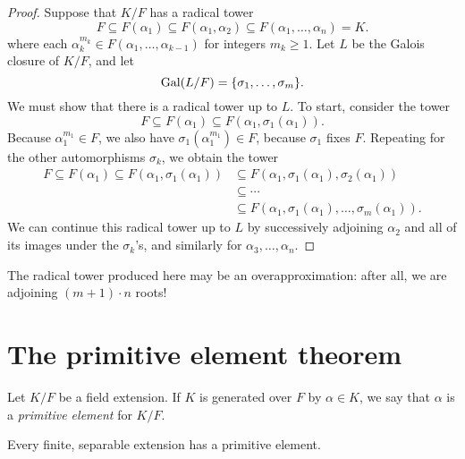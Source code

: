 \begin{proof}
    Suppose that $K/F$ has a radical tower
    \[
        F \subseteq F(\alpha_1) \subseteq F(\alpha_1, \alpha_2) \subseteq F(\alpha_1, \ldots, \alpha_n) = K.
    \]
    where each $\alpha_k^{m_k} \in F(\alpha_1, \ldots, \alpha_{k - 1})$ for integers $m_k \geq 1$. Let $L$ be the Galois closure of $K/F$, and let
    \[
        \operatorname{Gal}(L/F) = \{\sigma_1, \ldots, \sigma_m\}.
    \]
    We must show that there is a radical tower up to $L$. To start, consider the tower
    \[
        F \subseteq F(\alpha_1) \subseteq F(\alpha_1, \sigma_1(\alpha_1)).
    \]
    Because $\alpha_1^{m_1} \in F$, we also have $\sigma_1(\alpha_1^{m_1}) \in F$, because $\sigma_1$ fixes $F$. Repeating for the other automorphisms $\sigma_k$, we obtain the tower
    \begin{align*}
        F
        \subseteq F(\alpha_1)
        \subseteq F(\alpha_1, \sigma_1(\alpha_1))
        &\subseteq F(\alpha_1, \sigma_1(\alpha_1), \sigma_2(\alpha_1)) \\
        &\subseteq \cdots \\
        &\subseteq F(\alpha_1, \sigma_1(\alpha_1), \ldots, \sigma_m(\alpha_1)).
    \end{align*}
    We can continue this radical tower up to $L$ by successively adjoining $\alpha_2$ and all of its images under the $\sigma_k$'s, and similarly for $\alpha_3, \ldots, \alpha_n$.
\end{proof}

\begin{remark}
    The radical tower produced here may be an overapproximation: after all, we are adjoining $(m + 1) \cdot n$ roots!
\end{remark}

\section{The primitive element theorem}

\begin{definition}
    Let $K/F$ be a field extension. If $K$ is generated over $F$ by $\alpha \in K$, we say that $\alpha$ is a \emph{primitive element} for $K/F$.
\end{definition}

\begin{theorem}
\label{thm_prim_elem}
    Every finite, separable extension has a primitive element.
\end{theorem}

